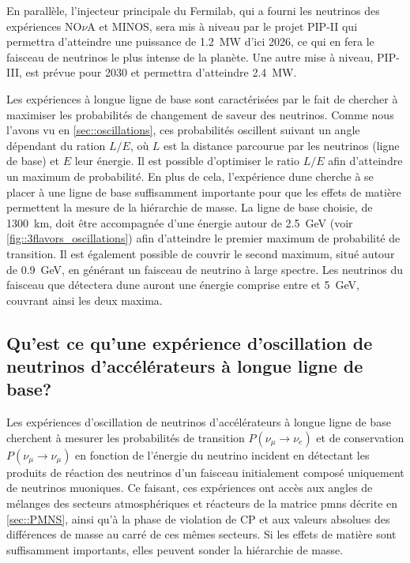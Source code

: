        En parallèle, l'injecteur principale du Fermilab, qui a fourni les neutrinos des expériences NO$\nu$A et MINOS, sera mis à niveau par le projet PIP-II qui permettra d'atteindre une puissance de \SI{1.2}{\mega\watt} d'ici 2026, ce qui en fera le faisceau de neutrinos le plus intense de la planète. Une autre mise à niveau, PIP-III, est prévue pour 2030 et permettra d'atteindre \SI{2.4}{\mega\watt}.
        
        Les expériences à longue ligne de base sont caractérisées par le fait de chercher à maximiser les probabilités de changement de saveur des neutrinos. Comme nous l'avons vu en \autoref{sec::oscillations}, ces probabilités oscillent suivant un angle dépendant du ration $L/E$, où $L$ est la distance parcourue par les neutrinos (ligne de base) et $E$ leur énergie. Il est possible d'optimiser le ratio $L/E$ afin d'atteindre un maximum de probabilité. En plus de cela, l'expérience \gls{dune} cherche à se placer à une ligne de base suffisamment importante pour que les effets de matière permettent la mesure de la hiérarchie de masse. La ligne de base choisie, de \SI{1300}{\kilo\meter}, doit être accompagnée d'une énergie autour de \SI{2.5}{\giga\electronvolt} (voir \autoref{fig::3flavors_oscillations}) afin d'atteindre le premier maximum de probabilité de transition. Il est également possible de couvrir le second maximum, situé autour de \SI{0.9}{\giga\electronvolt}, en générant un faisceau de neutrino à large spectre. Les neutrinos du faisceau que détectera \gls{dune} auront une énergie comprise entre  et \SI{5}{\giga\electronvolt}, couvrant ainsi les deux maxima.
        
        \subsection{Qu'est ce qu'une expérience d'oscillation de neutrinos d'accélérateurs à longue ligne de base?}
            
            Les expériences d'oscillation de neutrinos d'accélérateurs à longue ligne de base cherchent à mesurer les probabilités de transition $P(\nu_{\mu}\to \nu_e)$ et de conservation $P(\nu_{\mu}\to \nu_{\mu})$ en fonction de l'énergie du neutrino incident en détectant les produits de réaction des neutrinos d'un faisceau initialement composé uniquement de neutrinos muoniques. Ce faisant, ces expériences ont accès aux angles de mélanges des secteurs atmosphériques et réacteurs de la matrice \gls{pmns} décrite en \autoref{sec::PMNS}, ainsi qu'à la phase de violation de CP et aux valeurs absolues des différences de masse au carré de ces mêmes secteurs. Si les effets de matière sont suffisamment importants, elles peuvent sonder la hiérarchie de masse.
            
